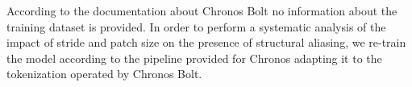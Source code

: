 According to the documentation about Chronos Bolt \cite{FastAccurateZeroshot2024a,ChronosBoltPipelineAmazonscienceChronosforecastinga} no information about the training dataset is provided. In order to perform a systematic analysis of the impact of stride and patch size on the presence of structural aliasing, we re-train the model according to the pipeline provided for Chronos \cite{ansariChronosLearningLanguage2024a} adapting it to the tokenization operated by Chronos Bolt.

